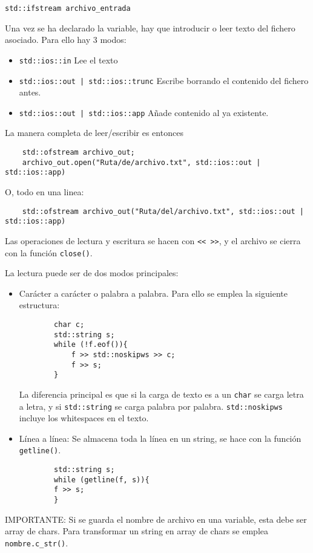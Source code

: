\documentclass[a4paper]{article}
\begin{document}
	\verb|std::ifstream archivo_entrada|
	
	Una vez se ha declarado la variable, hay que introducir o leer texto del fichero asociado. Para ello hay 3 modos:
	\begin{itemize}
		\item \verb|std::ios::in| Lee el texto
		\item \verb!std::ios::out | std::ios::trunc! Escribe borrando el contenido del fichero antes.
		\item \verb!std::ios::out | std::ios::app! Añade contenido al ya existente.
	\end{itemize}
	
	La manera completa de leer/escribir es entonces
	\begin{lstlisting}
	std::ofstream archivo_out;
	archivo_out.open("Ruta/de/archivo.txt", std::ios::out | std::ios::app)
	\end{lstlisting}
	
	O, todo en una linea:
	\begin{lstlisting}
	std::ofstream archivo_out("Ruta/del/archivo.txt", std::ios::out | std::ios::app)
	\end{lstlisting}
	
	Las operaciones de lectura y escritura se hacen con \verb|<< >>|, y el archivo se cierra con la función \verb|close()|.
	
	La lectura puede ser de dos modos principales:
	\begin{itemize}
		\item Carácter a carácter o palabra a palabra. Para ello se emplea la siguiente estructura:
		\begin{lstlisting}
		char c;
		std::string s;
		while (!f.eof()){
			f >> std::noskipws >> c;
			f >> s;
		}
		\end{lstlisting}
		La diferencia principal es que si la carga de texto es a un \verb|char| se carga letra a letra, y si \verb|std::string| se carga palabra por palabra. \verb|std::noskipws| incluye los whitespaces en el texto.
		\item Línea a línea: Se almacena toda la línea en un string, se hace con la función \verb|getline()|. 
		\begin{lstlisting}
		std::string s;
		while (getline(f, s)){
		f >> s;
		}
		\end{lstlisting}
	\end{itemize}
	
	IMPORTANTE: Si se guarda el nombre de archivo en una variable, esta debe ser array de chars. Para transformar un string en array de chars se emplea \verb|nombre.c_str()|.
	
\end{document}
